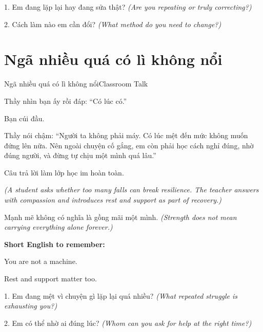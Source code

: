 \begin{tuhocnhanh}
1. Em đang lặp lại hay đang sửa thật? \textit{(Are you repeating or truly correcting?)}

2. Cách làm nào em cần đổi? \textit{(What method do you need to change?)}
\end{tuhocnhanh}
\ngancach

\section{Ngã nhiều quá có lì không nổi}
\begin{truyen}{Ngã nhiều quá có lì không nổi}{Classroom Talk}

Thầy nhìn bạn ấy rồi đáp: ``Có lúc có.''

Bạn cúi đầu.

Thầy nói chậm: ``Người ta không phải máy. Có lúc mệt đến mức không muốn đứng lên nữa. Nên ngoài chuyện cố gắng, em còn phải học cách nghỉ đúng, nhờ đúng người, và đừng tự chịu một mình quá lâu.''

Câu trả lời làm lớp học im hoàn toàn.

\textit{(A student asks whether too many falls can break resilience. The teacher answers with compassion and introduces rest and support as part of recovery.)}
\end{truyen}

\begin{baihoc}
Mạnh mẽ không có nghĩa là gồng mãi một mình.
\textit{(Strength does not mean carrying everything alone forever.)}
\end{baihoc}

\begin{ghinhoanh}
\textbf{Short English to remember:}

You are not a machine.

Rest and support matter too.
\end{ghinhoanh}

\begin{tuhocnhanh}
1. Em đang mệt vì chuyện gì lặp lại quá nhiều? \textit{(What repeated struggle is exhausting you?)}

2. Em có thể nhờ ai đúng lúc? \textit{(Whom can you ask for help at the right time?)}
\end{tuhocnhanh}
\ngancach

